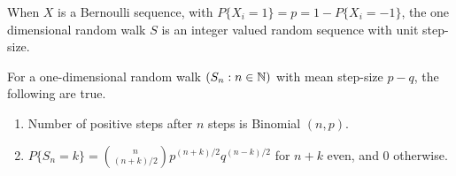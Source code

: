 \documentclass[a4paper,10pt,english]{article}
\begin{document}
When $X$ is a Bernoulli sequence, with $P\{X_i = 1\} = p = 1 - P\{X_i = -1\}$, 
the one dimensional random walk $S$ is an integer valued random sequence with unit step-size. 
\begin{thm} 
For a one-dimensional random walk $(S_n: n \in \mathbb{N})$ with mean step-size $p-q$, the following are true. 
\begin{enumerate}[i\_]
\item Number of positive steps after $n$ steps is Binomial $(n,p)$. 
\item $P\{S_n = k\} = \binom{n}{(n+k)/2}p^{(n+k)/2}q^{(n-k)/2}$ for $n+k$ even, and $0$ otherwise. 
\end{enumerate}
\end{thm}
\end{document}
